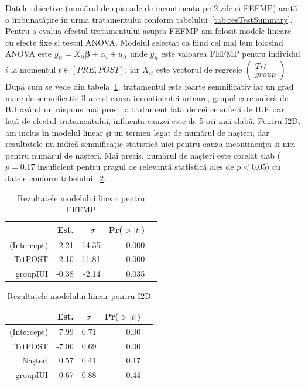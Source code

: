 \documentclass[12pt]{article}
\begin{document}
  Datele obiective (numărul de episoade de incontinența pe 2 zile și \ac{FEFMP}) arată o îmbunatățire în urma tratamentului conform tabelului~\ref{tab:resTestSummary}. Pentru a evalua efectul tratamentului asupra \ac{FEFMP} am folosit modele lineare cu efecte fixe și testul ANOVA. Modelul selectat ca fiind cel mai bun folosind ANOVA este $y_{it} = X_{it}\mathbf{\beta}+\alpha_{i}+u_{it}$ unde $y_{it}$ este valoarea FEFMP pentru individul $i$ la momentul $t \in [PRE,POST]$, iar $X_{it}$ este vectorul de regresie $\left(\!\begin{array}{c}Trt\\group\end{array}\right)$. După cum se vede din tabela~\ref{tab:resFEFMPlm}, tratamentul este foarte semnificativ iar un grad mare de semnificație îl are și cauza incontinentei urinare, grupul care suferă de \ac{IUI} având un răspuns mai prost la tratament fata de cei ce suferă de \ac{IUE} dar față de efectul tratamentului, influența cauzei este de 5 ori mai slabă.
  Pentru I2D, am inclus în modelul linear și un termen legat de numărul de nașteri, dar rezultatele nu indică semnificație statistică nici pentru cauza incontinenței și nici pentru numărul de nașteri. Mai precis, numărul de nașteri este corelat slab ($p=0.17$ insuficient pentru pragul de  relevanță statistică ales de $p<0.05$) cu datele conform tabelului~ \ref{tab:resI2Dlm}.
  \begin{table}[H]
		\centering
		\begin{tabular}{rrrrr}
			\hline
			& Est. & $\sigma~~~$ & Pr($>|t|$) \\ \hline
			(Intercept) & 2.21 & 14.35 & 0.000 \\ 
			TrtPOST & 2.10  & 11.81 & 0.000 \\ 
			groupIUI & -0.38 & -2.14 & 0.035 \\ \hline
		\end{tabular}
		\caption{Rezultatele modelului linear pentru FEFMP} 
		\label{tab:resFEFMPlm}
	\end{table}
  
	\begin{table}[H]
		\centering
		\begin{tabular}{rrrrr}
			\hline
			& Est. & $\sigma~~~$ & Pr($>|t|$) \\ \hline
			(Intercept) & 7.99 & 0.71 & 0.00 \\ 
			TrtPOST & -7.06 & 0.69 & 0.00 \\ 
			Nașteri & 0.57 & 0.41 & 0.17 \\
			groupIUI & 0.67 & 0.88 & 0.44 \\ \hline
		\end{tabular}
		\caption{Rezultatele modelului linear pentru I2D} 
		\label{tab:resI2Dlm}
	\end{table}
\end{document}
